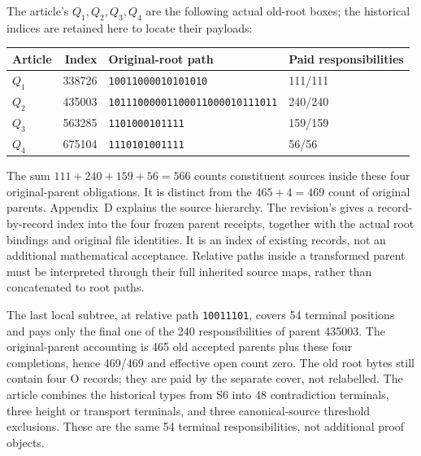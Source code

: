 \documentclass[10pt]{article}
\begin{document}
The article's \(Q_1,Q_2,Q_3,Q_4\) are the following actual old-root
boxes; the historical indices are retained here to locate their payloads:
\begin{center}
\begin{tabular}{@{}lrll@{}}
\toprule
Article&Index&Original-root path&Paid responsibilities\\
\midrule
\(Q_1\)&338726&\texttt{10011000010101010}&111/111\\
\(Q_2\)&435003&\texttt{10111000001100011000010111011}&240/240\\
\(Q_3\)&563285&\texttt{1101000101111}&159/159\\
\(Q_4\)&675104&\texttt{1110101001111}&56/56\\
\bottomrule
\end{tabular}
\end{center}
The sum \(111+240+159+56=566\) counts constituent sources inside
these four original-parent obligations. It is distinct from the
\(465+4=469\) count of original parents. Appendix~D explains the source
hierarchy. The revision's
 gives a record-by-record index
into the four frozen parent receipts, together with the actual root
bindings and original file identities. It is an index of existing
records, not an additional mathematical acceptance. Relative paths
inside a transformed parent must be interpreted through their full
inherited source maps, rather than concatenated to root paths.

The last local subtree, at relative path \texttt{10011101}, covers
54 terminal positions and pays only the final one of the 240
responsibilities of parent 435003. The original-parent accounting is
465 old accepted parents plus these four completions, hence 469/469
and effective open count zero. The old root bytes still contain four
O records; they are paid by the separate cover, not relabelled.
The article combines the historical types from S6 into 48 contradiction
terminals, three height or transport terminals, and three canonical-source
threshold exclusions. These are the same 54 terminal responsibilities,
not additional proof objects.
\end{document}
